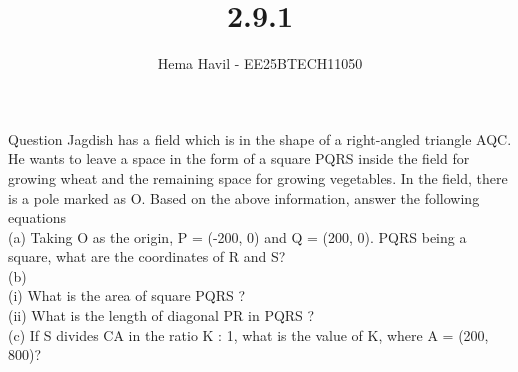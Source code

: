 \documentclass{beamer}
\title %
{2.9.1}
\author %
{Hema Havil - EE25BTECH11050}
\begin{document}
	
	\frame{\titlepage}
	\begin{frame}{Question}
		Jagdish has a field which is in the shape of a right-angled triangle AQC. He wants to leave a space in the form of a square PQRS inside the field for growing wheat and the remaining space for growing vegetables. In the field, there is a pole marked as O. Based on the above information, answer the following equations\\
            (a) Taking O as the origin, P = (-200, 0) and Q = (200, 0). PQRS being a square, what are the coordinates of R and S?\\
            (b)\\  
              (i) What is the area of square PQRS ?\\
              (ii) What is the length of diagonal PR in PQRS ?\\
            (c) If S divides CA in the ratio K : 1, what is the value of K, where A = (200, 800)?
	\end{frame}
\end{document}
